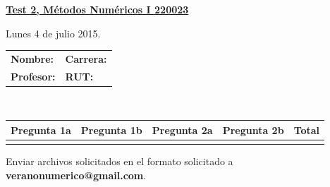 \documentclass[11pt]{article}
\begin{document}
\hspace*{-1,5cm}

\vspace*{0.5cm} \centerline {\bf\underline{Test 2, M\'etodos Num\'ericos I 220023 }}
\centerline{\textrm{Lunes 4 de julio 2015.}}  \vspace{0.2cm}


\begin{center}
 \begin{tabular}{p{}p{}}
	\textbf{Nombre:}   &\textbf{Carrera:}\\
	\textbf{Profesor:} & \textbf{ RUT:}
 \end{tabular}
 \\
 \vspace{0.2cm}
 \begin{tabular}{||p{2.2cm}|p{2.2cm}|p{2.2cm}|p{2.2cm}||p{2cm}||}
 \hline
 Pregunta 1a &  Pregunta 1b  & Pregunta 2a  & Pregunta 2b &   Total\\
 \hline
 \vspace{1.5cm} & & & &   \\
 \hline
 \end{tabular}
 \end{center}
 Enviar archivos solicitados en el formato solicitado a \textbf{veranonumerico@gmail.com}.
\end{document}
